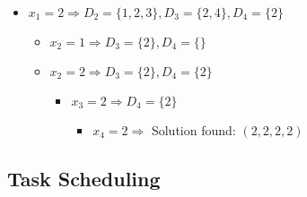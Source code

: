 \documentclass[a4paper, oneside]{scrartcl}
\begin{document}
\begin{enumerate}
  \begin{itemize} 
  \renewcommand{\labelitemi}{$\bullet$}
  \renewcommand{\labelitemii}{$\bullet$}
  \renewcommand{\labelitemiii}{$\bullet$}
  \renewcommand{\labelitemiv}{$\bullet$}
        \item $x_1 = 2 \Rightarrow D_2 = \{1,2,3\}, D_3 = \{2,4\}, D_4 = \{2\}$
        \begin{itemize}
            \item $x_2 = 1 \Rightarrow D_3 = \{2\}, D_4 = \{\}$
            \item $x_2 = 2 \Rightarrow D_3 = \{2\}, D_4 = \{2\}$
            \begin{itemize}
                \item $x_3 = 2 \Rightarrow D_4 = \{2\}$
                \begin{itemize}
                    \item $x_4 = 2 \Rightarrow$ Solution found: $(2,2,2,2)$
                \end{itemize}
            \end{itemize}
        \end{itemize}
  \end{itemize}


\end{enumerate}

\subsection{Task Scheduling}
\end{document}
